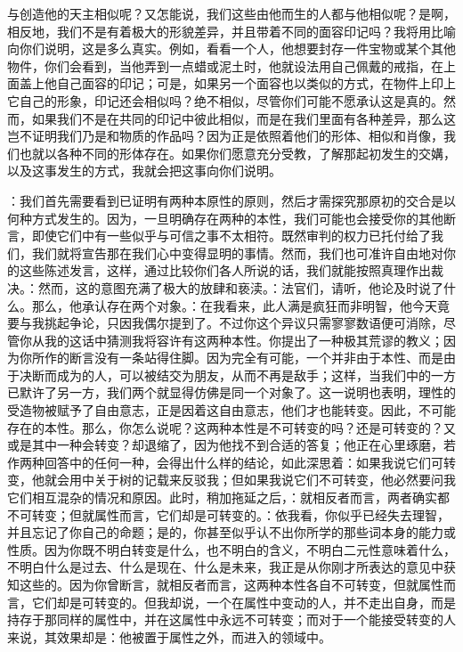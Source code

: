 与创造他的天主相似呢？又怎能说，我们这些由他而生的人都与他相似呢？是啊，相反地，我们不是有着极大的形貌差异，并且带着不同的面容印记吗？我将用比喻向你们说明，这是多么真实。例如，看看一个人，他想要封存一件宝物或某个其他物件，你们会看到，当他弄到一点蜡或泥土时，他就设法用自己佩戴的戒指，在上面盖上他自己面容的印记；可是，如果另一个面容也以类似的方式，在物件上印上它自己的形象，印记还会相似吗？绝不相似，尽管你们可能不愿承认这是真的。然而，如果我们不是在共同的印记中彼此相似，而是在我们里面有各种差异，那么这岂不证明我们乃是和物质的作品吗？因为正是依照着他们的形体、相似和肖像，我们也就以各种不同的形体存在。如果你们愿意充分受教，了解那起初发生的交媾，以及这事发生的方式，我就会把这事向你们说明。\par

：我们首先需要看到已证明有两种本原性的原则，然后才需探究那原初的交合是以何种方式发生的。因为，一旦明确存在两种的本性，我们可能也会接受你的其他断言，即使它们中有一些似乎与可信之事不太相符。既然审判的权力已托付给了我们，我们就将宣告那在我们心中变得显明的事情。然而，我们也可准许自由地对你的这些陈述发言，这样，通过比较你们各人所说的话，我们就能按照真理作出裁决。：然而，这的意图充满了极大的放肆和亵渎。：法官们，请听，他论及时说了什么。那么，他承认存在两个对象。：在我看来，此人满是疯狂而非明智，他今天竟要与我挑起争论，只因我偶尔提到了。不过你这个异议只需寥寥数语便可消除，尽管你从我的这话中猜测我将容许有这两种本性。你提出了一种极其荒谬的教义；因为你所作的断言没有一条站得住脚。因为完全有可能，一个并非由于本性、而是由于决断而成为的人，可以被结交为朋友，从而不再是敌手；这样，当我们中的一方已默许了另一方，我们两个就显得仿佛是同一个对象了。这一说明也表明，理性的受造物被赋予了自由意志，正是因着这自由意志，他们才也能转变。因此，不可能存在的本性。那么，你怎么说呢？这两种本性是不可转变的吗？还是可转变的？又或是其中一种会转变？却退缩了，因为他找不到合适的答复；他正在心里琢磨，若作两种回答中的任何一种，会得出什么样的结论，如此深思着：如果我说它们可转变，他就会用中关于树的记载来反驳我；但如果我说它们不可转变，他必然要问我它们相互混杂的情况和原因。此时，稍加拖延之后，：就相反者而言，两者确实都不可转变；但就属性而言，它们却是可转变的。：依我看，你似乎已经失去理智，并且忘记了你自己的命题；是的，你甚至似乎认不出你所学的那些词本身的能力或性质。因为你既不明白转变是什么，也不明白的含义，不明白二元性意味着什么，不明白什么是过去、什么是现在、什么是未来，我正是从你刚才所表达的意见中获知这些的。因为你曾断言，就相反者而言，这两种本性各自不可转变，但就属性而言，它们却是可转变的。但我却说，一个在属性中变动的人，并不走出自身，而是持存于那同样的属性中，并在这属性中永远不可转变；而对于一个能接受转变的人来说，其效果却是：他被置于属性之外，而进入的领域中。\par

